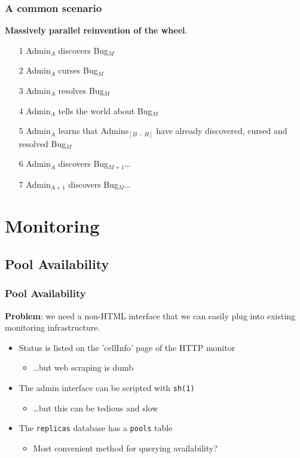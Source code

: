 \documentclass{beamer}
\begin{document}
\begin{frame}
\frametitle{A common scenario}
{\large {\bf Massively parallel reinvention of the wheel}.}
\begin{itemize}
    \item[1] Admin\ensuremath{_A} discovers Bug\ensuremath{_M}
    \item[2] Admin\ensuremath{_A} curses Bug\ensuremath{_M}
    \item[3] Admin\ensuremath{_A} resolves Bug\ensuremath{_M}
    \item[4] Admin\ensuremath{_A} tells the world about Bug\ensuremath{_M}
    \item[5] Admin\ensuremath{_A} learns that Admins\ensuremath{_{[B-H]}} have already discovered, cursed and resolved Bug\ensuremath{_M}
    \item[6] Admin\ensuremath{_A} discovers Bug\ensuremath{_{M+1}}\dots{}
    \item[7] Admin\ensuremath{_{A+1}} discovers Bug\ensuremath{_M}\dots{}
\end{itemize}


\end{frame}

\section{Monitoring}
\subsection{Pool Availability}
\begin{frame}
\frametitle{Pool Availability}
{\large {\bf Problem}: we need a non-HTML interface that we can easily plug into existing monitoring infrastructure.}
\vspace{1 cm}
\begin{itemize}
    \item Status is listed on the 'cellInfo' page of the HTTP monitor
    \begin{itemize}
        \item \dots{}but web scraping is dumb
    \end{itemize}
    \item The admin interface can be scripted with {\tt sh(1)}
    \begin{itemize}
        \item \dots{}but this can be tedious and slow
    \end{itemize}
    \item The {\tt replicas} database has a {\tt pools} table
    \begin{itemize}
        \item Most convenient method for querying availability?
    \end{itemize}
\end{itemize}
\end{frame}
\end{document}
